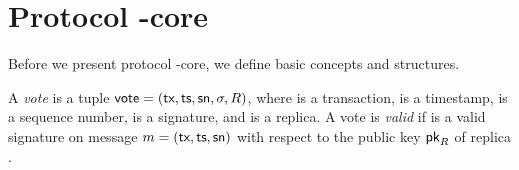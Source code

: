 \section{Protocol \podtm-core}\label{sec:pod-core-const}

Before we present protocol \podtm-core, we define basic concepts and structures.

\begin{definition}[Vote]
    A \emph{vote} is a tuple $\textsf{vote} = (\textsf{tx}, \textsf{ts}, \textsf{sn}, \sigma, R)$, where \tx is a transaction, \tsp is a timestamp, \sn is a sequence number, \sig is a signature, and  \rep is a replica.
    A vote is \emph{valid} if \sig is a valid signature on message $m = (\textsf{tx}, \textsf{ts}, \textsf{sn})$ with respect to the public key $\textsf{pk}_R$ of replica \rep.
\end{definition}



